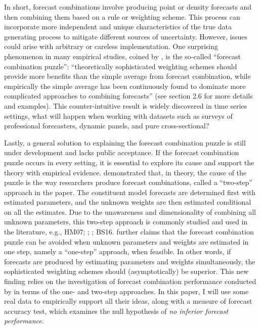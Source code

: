 \documentclass{monashthesis}
\begin{document}
In short, forecast combinations involve producing point or density forecasts and then combining them based on a rule or weighting scheme. This process can incorporate more independent and unique characteristics of the true data generating process to mitigate different sources of uncertainty. However, issues could arise with arbitrary or careless implementation. One surprising phenomenon in many empirical studies, coined by \textcite{SW04}, is the so-called ``forecast combination puzzle'': ``theoretically sophisticated weighting schemes should provide more benefits than the simple average from forecast combination, while empirically the simple average has been continuously found to dominate more complicated approaches to combining forecasts'' \autocite{WHLK22} (see section 2.6 for more details and examples). This counter-intuitive result is widely discovered in time series settings, what will happen when working with datasets such as surveys of professional forecasters, dynamic panels, and pure cross-sectional?

Lastly, a general solution to explaining the forecast combination puzzle is still under development and lacks public acceptance. If the forecast combination puzzle occurs in every setting, it is essential to explore its cause and support the theory with empirical evidence. \textcite{FZMP23} demonstrated that, in theory, the cause of the puzzle is the way researchers produce forecast combinations, called a ``two-step'' approach in the paper. The constituent model forecasts are determined first with estimated parameters, and the unknown weights are then estimated conditional on all the estimates. Due to the unawareness and dimensionality of combining all unknown parameters, this two-step approach is commonly studied and used in the literature, e.g., HM07; \textcite{GA11}; \textcite{GR13}; BS16. \textcite{FZMP23} further claims that the forecast combination puzzle can be avoided when unknown parameters and weights are estimated in one step, namely a ``one-step'' approach, when feasible. In other words, if forecasts are produced by estimating parameters and weights simultaneously, the sophisticated weighting schemes should (asymptotically) be superior. This new finding relies on the investigation of forecast combination performance conducted by \textcite{ZMFP22} in terms of the one- and two-step approaches. In this paper, I will use some real data to empirically support all their ideas, along with a measure of forecast accuracy test, which examines the null hypothesis of \emph{no inferior forecast performance}.
\end{document}

